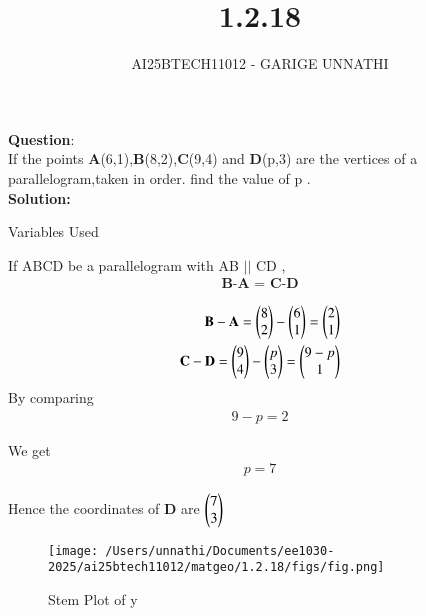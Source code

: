 \documentclass[journal]{IEEEtran}
\begin{document}

\vspace{3cm}

\title{1.2.18}
\author{AI25BTECH11012 - GARIGE UNNATHI}
{\let\newpage\relax\maketitle}


\renewcommand{\thefigure}{\theenumi}
\renewcommand{\thetable}{\theenumi}
\setlength{\intextsep}{10pt} %


\renewcommand{\thetable}{\theenumi}


\textbf{Question}:\\
If the points \textbf{A}(6,1),\textbf{B}(8,2),\textbf{C}(9,4) and \textbf{D}(p,3) are the vertices of a parallelogram,taken in order. find the value of p .
\\
\textbf{Solution: }

 \begin{table}[h!]    
      \centering
      
      \caption{Variables Used}
      \label{}
    \end{table}

 If ABCD be a parallelogram with AB $||$ CD ,
 \begin{align*}
\textbf{B-A $=$ C-D}
\end{align*}


\begin{align}
    \textbf{B}-\textbf{A}=\begin{pmatrix}8 \\ 2\end{pmatrix} -\begin{pmatrix}6 \\ 1\end{pmatrix}=\begin{pmatrix}2 \\ 1\end{pmatrix}\\
    \textbf{C}-\textbf{D}=\begin{pmatrix}9 \\ 4\end{pmatrix} -\begin{pmatrix}p \\ 3\end{pmatrix}=\begin{pmatrix}9-p \\ 1\end{pmatrix} 
\end{align}
By comparing 
\begin{align}
    9-p = 2
\end{align}

We get 
\begin{align}
    p = 7
\end{align}

Hence the coordinates of \textbf{D} are $\begin{pmatrix}7 \\ 3\end{pmatrix}$

\begin{figure}[h!]
   \centering
   \texttt{[image: /Users/unnathi/Documents/ee1030-2025/ai25btech11012/matgeo/1.2.18/figs/fig.png]}
   \caption{Stem Plot of y}
   \label{stemplot}
\end{figure}
\end{document}
